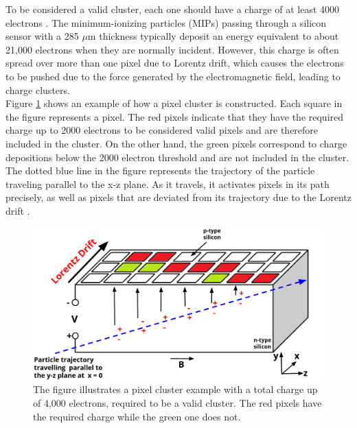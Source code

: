 To be considered a valid cluster, each one should have a charge of at least 4000 electrons \cite{Track_Reco_2014,phase1_Pixel_Detector}. The minimum-ionizing particles (MIPs) passing through a silicon sensor with a 285 $\mu \text{m}$ thickness typically deposit an energy equivalent to about 21,000 electrons when they are normally incident. However, this charge is often spread over more than one pixel due to Lorentz drift,  which causes the electrons to be pushed due to the force generated by the electromagnetic field, leading to charge clusters.\\

Figure \ref{cluster}  shows an example of how a pixel cluster is constructed. Each square in the figure represents a pixel. The red pixels indicate that they have the required charge up to 2000 electrons to be considered valid pixels and are therefore included in the cluster. On the other hand, the green pixels correspond to charge depositions below the 2000 electron threshold and are not included in the cluster.
The dotted blue line in the figure represents the trajectory of the particle traveling parallel to the x-z plane. As it travels, it activates pixels in its path precisely, as well as pixels that are deviated from its trajectory due to the Lorentz drift \cite{Pixel_Hit_Reconstruction}.\\

\begin{center}
  \begin{figure}[h]
    \centering
    \includegraphics[scale=.25]{Chapter2/pixel_cluster.png} 
    \caption[Construction of a pixel cluster]{ The figure illustrates a pixel cluster example with a total charge up of 4,000 electrons, required to be a valid cluster. The red pixels have the required charge while the green one does not.}
    \label{cluster}
  \end{figure}
\end{center}


